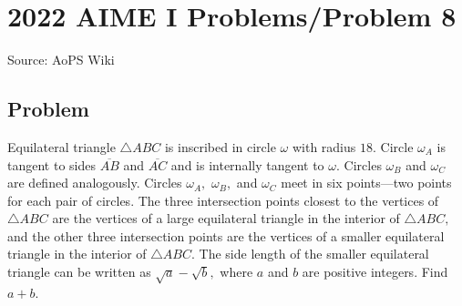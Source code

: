 \documentclass[12pt]{article}
\begin{document}
\section*{{2022 AIME I Problems/Problem 8}}
Source: AoPS Wiki

\subsection*{Problem}
Equilateral triangle $\triangle ABC$ is inscribed in circle $\omega$ with radius $18.$ Circle $\omega_A$ is tangent to sides $\overline{AB}$ and $\overline{AC}$ and is internally tangent to $\omega.$ Circles $\omega_B$ and $\omega_C$ are defined analogously. Circles $\omega_A,$ $\omega_B,$ and $\omega_C$ meet in six points---two points for each pair of circles. The three intersection points closest to the vertices of $\triangle ABC$ are the vertices of a large equilateral triangle in the interior of $\triangle ABC,$ and the other three intersection points are the vertices of a smaller equilateral triangle in the interior of $\triangle ABC.$ The side length of the smaller equilateral triangle can be written as $\sqrt{a} - \sqrt{b},$ where $a$ and $b$ are positive integers. Find $a+b.$
\end{document}
